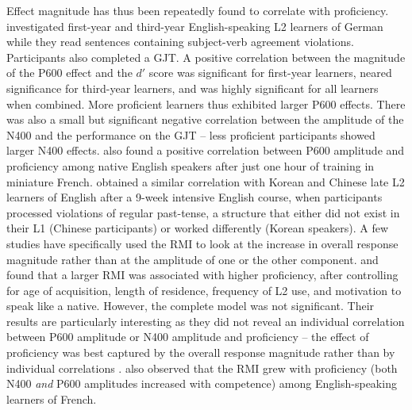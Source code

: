 \documentclass[output=paper,colorlinks,citecolor=brown,modfonts,nonflat]{../langscibook}
\begin{document}
Effect magnitude has thus been repeatedly found to correlate with proficiency. \citet{TannerEtAl2009,TannerEtAl2013} investigated first-year and third-year English-speaking L2 learners of German while they read sentences containing subject-verb agreement violations. Participants also completed a  GJT. A positive correlation between the magnitude of the P600 effect and the $d′$ score was significant for first-year learners, neared significance for third-year learners, and was highly significant for all learners when combined. More proficient learners thus exhibited larger P600 effects. There was also a small but significant negative correlation between the amplitude of the N400 and the performance on the GJT – less proficient participants showed larger N400 effects. \citet{BatterinkNeville2013} also found a positive correlation between P600 amplitude and proficiency among native English speakers after just one hour of training in miniature French. \citet{WhiteEtAl2012} obtained a similar correlation with Korean and Chinese late L2 learners of English after a 9-week intensive English course, when participants processed violations of regular past-tense, a structure that either did not exist in their L1 (Chinese participants) or worked differently (Korean speakers). A few studies have specifically used the RMI to look at the increase in overall response magnitude rather than at the amplitude of one or the other component. \citet{TannerEtAl2012} and \citet{TannerEtAl2014} found that a larger RMI was associated with higher proficiency, after controlling for age of acquisition, length of residence, frequency of L2 use, and motivation to speak like a native. However, the complete model was not significant. Their results are particularly interesting as they did not reveal an individual correlation between P600 amplitude or N400 amplitude and proficiency – the effect of proficiency was best captured by the overall response magnitude rather than by individual correlations \citep{TannerEtAl2014}. \citet{FromontEtAl2012} also observed that the RMI grew with proficiency (both N400 \textit{and} P600 amplitudes increased with competence) among English-speaking learners of French.
\end{document}
